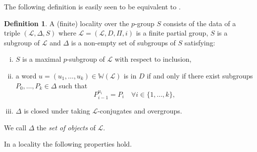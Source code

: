 \documentclass{amsart}
\numberwithin{equation}{section}
\theoremstyle{definition}
\newtheorem{definition}[equation]{Definition}
\theoremstyle{subresult}
\theoremstyle{caseresult}
\newcommand{\W}{\mathbb{W}}
\renewcommand{\L}{\mathcal{L}}
\newcommand{\<}{\langle}
\renewcommand{\>}{\rangle}
\begin{document}
The following definition is easily seen to be equivalent to \cite[Definition 2.9]{Chermak:2013}.
\begin{definition}
    A (finite) locality over the $p$-group $S$ consists of the data of a triple $(\L,\Delta,S)$ where $\L=(\L,D,\Pi,i)$ is a finite partial group, $S$ is a subgroup of $\L$ and $\Delta$ is a non-empty set of subgroups of $S$ satisfying:
    \begin{enumerate}[(i)]
        \item $S$ is a maximal $p$-subgroup of $\L$ with respect to inclusion,
        \item a word $u=(u_1, \dots, u_k) \in \W(\L)$ is in $D$ if and only if there exist subgroups $P_0, \dots, P_k \in \Delta$ such that 
        \[
        P_{i-1}^{u_i} = P_i \quad \forall i \in \{1, \dots, k\},
        \]
        \item $\Delta$ is closed under taking $\L$-conjugates and overgroups.
    \end{enumerate}
    We call $\Delta$ the \emph{set of objects} of $\L$.
\end{definition}

In a locality the following properties hold.
\end{document}
